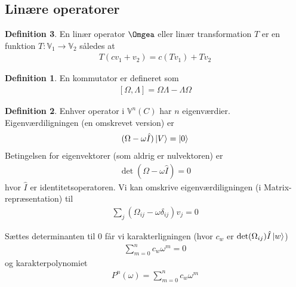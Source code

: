 \documentclass[12pt]{article}
\theoremstyle{definition}
\theoremstyle{remark}
\theoremstyle{definition}
\newtheorem{definition}{Definition}[section]
\newcounter{theo}[section]\setcounter{theo}{0}
\numberwithin{equation}{section}
\begin{document}
\subsection{Linære operatorer}
\begin{definition}
En linær operator $\Omgea$ eller linær transformation $T$ er en funktion $T:\mathbb V_1 \to \mathbb V_2$ således at
\begin{align}
  \label{eq:2}
  T(cv_1+v_2) = c(Tv_1) + Tv_2
\end{align}

\begin{definition}
  En kommutator er defineret som
  \begin{align}
    \label{eq:com}
    [\Omega, \Lambda] = \Omega\Lambda - \Lambda \Omega
  \end{align}

\end{definition}

\begin{definition}
Enhver operator i $\mathbb V^n(C)$ har $n$ eigenværdier. Eigenværdiligningen (en omskrevet version) er
\begin{align}
  \label{eq:eigen}
  (\Omega - \omega \hat I)\ket V = \ket 0
\end{align}
Betingelsen for eigenvektorer (som aldrig er nulvektoren) er
\begin{align}
  \label{eq:kre}
  \det(\Omega-\omega \hat I) = 0
\end{align}
hvor $\hat I$ er identitetsoperatoren. Vi kan omskrive eigenværdiligningen (i Matrix-repræsentation) til
\begin{align}
  \label{eq:eig2}
  \sum_j (\Omega_{ij}-\omega \delta_{ij})v_j = 0
\end{align}

Sættes determinanten til 0 får vi karakterligningen (hvor $c_w$ er $\det(\Omega_{ij})\hat I\ket w$)
\begin{align}
  \label{eq:karklig}
  \sum_{m=0}^n c_w \omega^m = 0
\end{align}
og karakterpolynomiet
\begin{align}
  \label{eq:ei}
  P^n(\omega) = \sum_{m=0}^n c_w \omega^m
\end{align}
\end{definition}


\end{definition}
\end{document}
